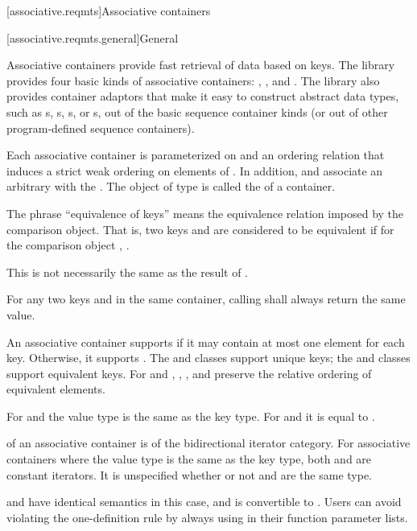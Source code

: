 [associative.reqmts]{Associative containers}

[associative.reqmts.general]{General}

\pnum
Associative containers provide fast retrieval of data based on keys.
The library provides four basic kinds of associative containers:
,
,
and
.
The library also provides container adaptors
that make it easy to construct abstract data types,
such as s, s,
s, or s,
out of the basic sequence container kinds
(or out of other program-defined sequence containers).

\pnum
Each associative container is parameterized on
and an ordering relation
that induces a strict weak ordering on
elements of
.
In addition,
and
associate an arbitrary 
with the
.
The object of type
is called the
of a container.

\pnum
The phrase ``equivalence of keys'' means the equivalence relation imposed by the
comparison object.
That is, two keys
and
are considered to be equivalent if for the
comparison object
,
.
\begin{note}
This is not necessarily the same as the result of .
\end{note}
For any two keys
and
in the same container, calling
shall always return the same value.

\pnum
An associative container supports  if it may contain at
most one element for each key. Otherwise, it supports .
The  and  classes support unique keys; the 
and  classes support equivalent keys.
For  and ,
, , and  preserve the relative ordering
of equivalent elements.

\pnum
For  and  the value type is the same as the key type.
For  and  it is equal to .

\pnum
{}
of an associative container is of the bidirectional iterator category.
For associative containers where the value type is the same as the key type, both
and
are constant iterators. It is unspecified whether or not
and
are the same type.
\begin{note}
 and  have identical semantics in this case, and  is convertible to . Users can avoid violating the one-definition rule by always using  in their function parameter lists.
\end{note}


